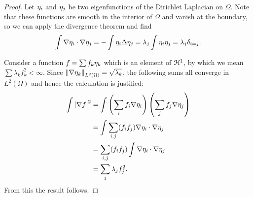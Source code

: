 \begin{proof}
Let $\eta_{i}$ and $\eta_{j}$ be two eigenfunctions of the Dirichlet Laplacian on $\Omega$.  Note that these functions are smooth in the interior of $\Omega$ and vanish at the boundary, so we can apply the divergence theorem and find
\[ \int \nabla \eta_{i} \cdot \nabla \eta_{j} = - \int \eta_{i} \Delta \eta_{j} = \lambda_j \int \eta_{i} \eta_{j} = \lambda_j \delta_{i=j}. \]

Consider a function $f = \sum f_k \eta_{k}$ which is an element of $\mathcal{H}^1$, by which we mean $\sum \lambda_k f_k^2 < \infty$.  Since $\left\lVert\nabla \eta_{k}\right\rVert_{L^2(\Omega)} = \sqrt{\lambda_k}$, the following sums all converge in $L^2(\Omega)$ and hence the calculation is justified:
\begin{align*}
\int \left\lvert \nabla f \right\rvert^2 &= \int \left( \sum_i f_i \nabla \eta_{i}  \right) \left( \sum_j f_j \nabla \eta_{j} \right)
\\ &= \int \sum_{i,j} (f_i f_j) \nabla \eta_{i} \cdot \nabla \eta_{j}
\\ &= \sum_{i,j} (f_i f_j) \int \nabla \eta_{i} \cdot \nabla \eta_{j}
\\ &= \sum_j \lambda_j f_j^2.
\end{align*}
From this the result follows.
\end{proof}


